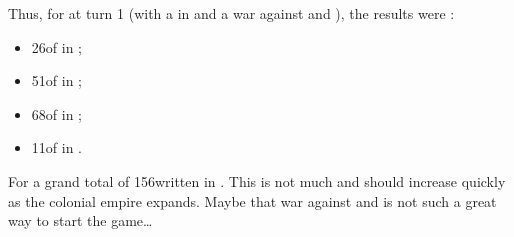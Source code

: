\begin{exemple}
  Thus, for \POR at turn 1 (with a \REVOLT in \provinceBeira and a war
  against \paysMaroc and \TUR), the results were :
  \begin{itemize}
  \item 26\ducats of  in  ;
  \item 51\ducats of  in
     ;
  \item 68\ducats of  in  ;
  \item 11\ducats of  in .
  \end{itemize}
  For a grand total of 156\ducats written in . This is not much and should increase quickly as the colonial
  empire expands. Maybe that war against \paysMaroc and \TUR is not such
  a great way to start the game\ldots
\end{exemple}


